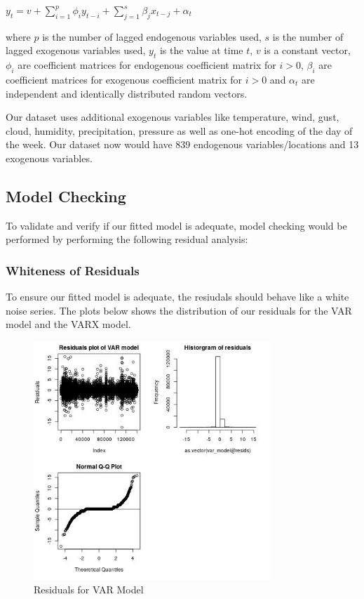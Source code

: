 \documentclass[12pt, letterpaper] {article}
\begin{document}
\begin{center}
    $\displaystyle y_t=v+\sum_{i=1}^{p} \phi_{i}y_{t-i}+\sum_{j=1}^{s} \beta_{j}x_{t-j}+\alpha_t$
\end{center}

\noindent where $p$ is the number of lagged endogenous variables used, $s$ is the number of lagged exogenous variables used, $y_t$ is the value at time $t$, $v$ is a constant vector, $\phi_i$ are coefficient matrices for endogenous coefficient matrix for $i>0$, $\beta_i$ are coefficient matrices for exogenous coefficient matrix for $i>0$ and $\alpha_t$ are independent and identically distributed random vectors. 

\noindent Our dataset uses additional exogenous variables like temperature, wind, gust, cloud, humidity, precipitation, pressure as well as one-hot encoding of the day of the week. Our dataset now would have 839 endogenous variables/locations and 13 exogenous variables.  

\subsection{Model Checking}
To validate and verify if our fitted model is adequate, model checking would be performed by performing the following residual analysis:


\subsubsection{Whiteness of Residuals}
To ensure our fitted model is adequate, the resiudals should behave like a white noise series. 
The plots below shows the distribution of our residuals for the VAR model and the VARX model. 

\begin{figure}[H]
    \centering
    \includegraphics[width=0.8\textwidth, height=0.42\textheight]{Images/Full_VAR_diff_resids.jpg}
    \caption{Residuals for VAR Model}
    \label{fig:Residuals for VAR Model}
\end{figure}
\end{document}
